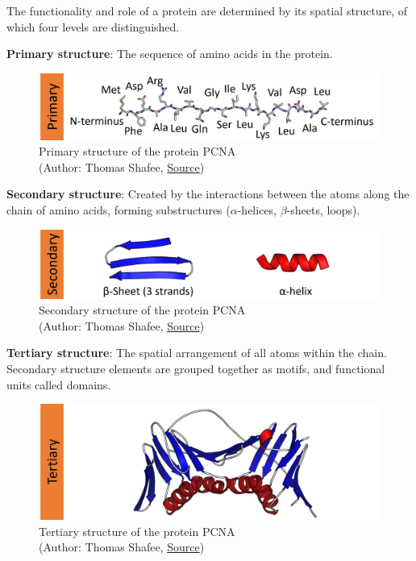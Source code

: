 The functionality and role of a protein are determined by its spatial structure, of which four levels are distinguished.

\textbf{Primary structure}: The sequence of amino acids in the protein.

\begin{figure}[H]
    \centering
    \includegraphics[width=\textwidth]{figures/bioinformatics/protein_structure_primary.png}
    \caption{Primary structure of the protein PCNA\\(Author: Thomas Shafee, \href{https://en.wikipedia.org/wiki/File:Protein\_structure\_(full).png}{Source})}
\end{figure}

\textbf{Secondary structure}: Created by the interactions between the atoms along the chain of amino acids, forming substructures ($\alpha$-helices, $\beta$-sheets, loops).

\begin{figure}[H]
    \centering
    \includegraphics[width=\textwidth]{figures/bioinformatics/protein_structure_secondary.png}
    \caption{Secondary structure of the protein PCNA\\(Author: Thomas Shafee, \href{https://en.wikipedia.org/wiki/File:Protein\_structure\_(full).png}{Source})}
\end{figure}

\textbf{Tertiary structure}: The spatial arrangement of all atoms within the chain. Secondary structure elements are grouped together as motifs, and functional units called domains.

\begin{figure}[H]
    \centering
    \includegraphics[width=\textwidth]{figures/bioinformatics/protein_structure_tertiary.png}
    \caption{Tertiary structure of the protein PCNA\\(Author: Thomas Shafee, \href{https://en.wikipedia.org/wiki/File:Protein\_structure\_(full).png}{Source})}
\end{figure}

